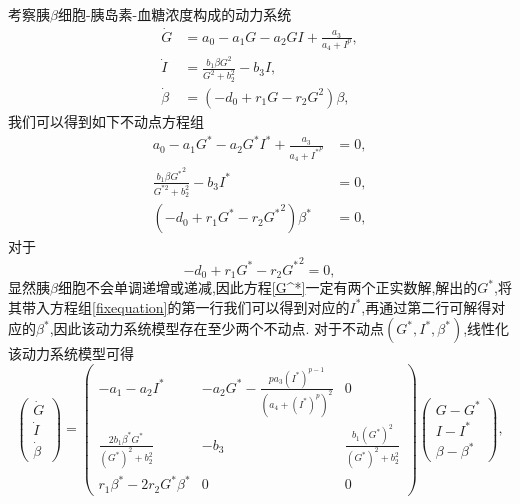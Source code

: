 考察胰$\beta$细胞-胰岛素-血糖浓度构成的动力系统
\begin{equation}
    \begin{aligned}
        \dot{G}     & = a_0-a_1G-a_2GI+\frac{a_3}{a_4+I^p} ,      \\
        \dot{I}     & = \frac{b_1\beta G^2}{G^2 + b_2^2} - b_3 I ,\\
        \dot{\beta} & = (-d_0+r_1G-r_2G^2)\beta,
    \end{aligned}
\end{equation}
我们可以得到如下不动点方程组
\begin{equation}\label{fixequation}
    \begin{aligned}
        a_0-a_1G^*-a_2G^*I^*+\frac{a_3}{a_4+{I^*}^p}     & =0, \\
        \frac{b_1\beta {G^*}^2}{G^{*2} + b_2^2} - b_3I^* & =0, \\
        (-d_0+r_1G^*-r_2{G^*}^2)\beta^*                  & =0,
    \end{aligned}
\end{equation}
对于
\begin{equation}\label{G^*}
    -d_0+r_1G^*-r_2{G^*}^2=0,
\end{equation}
显然胰$\beta$细胞不会单调递增或递减,因此方程\ref{G^*}一定有两个正实数解,解出的$G^*$,将其带入方程组\ref{fixequation}的第一行我们可以得到对应的$I^*$,再通过第二行可解得对应的$\beta^*$,因此该动力系统模型存在至少两个不动点. 对于不动点$(G^*,I^*,\beta^*)$,线性化该动力系统模型可得
\begin{equation}\label{linear}
    \begin{pmatrix}
        \dot{G} \\
        \dot{I} \\
        \dot{\beta}
    \end{pmatrix}=\begin{pmatrix}
        -a_1-a_2I^*                            & -a_2G^*-\frac{pa_3(I^*)^{p-1}}{(a_4+(I^*)^p)^2} & 0                                  \\
        \frac{2b_1\beta^*G^*}{(G^*)^2 + b_2^2} & -b_3                                            & \frac{b_1(G^*)^2}{(G^*)^2 + b_2^2} \\
        r_1\beta^*-2r_2G^*\beta^*              & 0                                               & 0
    \end{pmatrix}\begin{pmatrix}
        G-G^* \\
        I-I^* \\
        \beta-\beta^*
    \end{pmatrix},
\end{equation}

